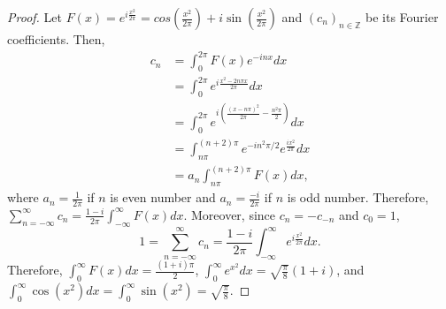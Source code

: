 \documentclass{article}
\begin{document}
\begin{enumerate}[font = \Large\bfseries\itshape\space, leftmargin = 3mm, labelsep = 3mm]
\begin{proof}
Let $F(x) = e^{i\frac{x^2}{2\pi}} = cos(\frac{x^2}{2\pi}) + i\sin(\frac{x^2}{2\pi})$ and $(c_n)_{n\in\mathbb{Z}}$ be its Fourier coefficients.
Then,
$$
\begin{aligned}
c_n &= \int_0^{2\pi} F(x) e^{-inx}dx\\
&= \int_0^{2\pi} e^{i \frac{x^2 - 2 n\pi x}{2\pi}}dx\\
&= \int_0^{2\pi} e^{i(\frac{(x-n\pi)^2}{2\pi} - \frac{n^2\pi}{2})}dx\\
&= \int_{n\pi}^{(n+2)\pi} e^{-in^2\pi/2} e^{\frac{ix^2}{2\pi}}dx\\
&= a_n\int_{n\pi}^{(n+2)\pi} F(x)dx,
\end{aligned}
$$
where $a_n = \frac{1}{2\pi}$ if $n$ is even number and $a_n = \frac{-i}{2\pi}$ if $n$ is odd number.
Therefore, $\sum_{n=-\infty}^{\infty} c_n = \frac{1-i}{2\pi}\int_{-\infty}^{\infty}F(x)dx$.
Moreover, since $c_n = -c_{-n}$ and $c_0 = 1$,
$$1 = \sum_{n=-\infty}^\infty c_n = \frac{1-i}{2\pi} \int_{-\infty}^\infty e^{i\frac{x^2}{2\pi}}dx.$$
Therefore, $\int_{0}^\infty F(x)dx = \frac{(1+i)\pi}{2}$, $\int_0^{\infty} e^{x^2} dx = \sqrt{\frac{\pi}{8}}(1+i)$, and
$\int_0^{\infty}\cos(x^2)dx = \int_0^{\infty} \sin(x^2) = \sqrt{\frac{\pi}{8}}$.
\end{proof}
\end{enumerate}
\end{document}
